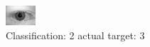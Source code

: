 \begin{figure}[h!]
\begin{center}
\includegraphics[width=0.60\columnwidth]{figures/ID660_class_2_target_3.png}
\end{center}
\caption{ Classification: 2 actual target: 3}
\label{fig:ID660_class_2_target_3}
\end{figure}
